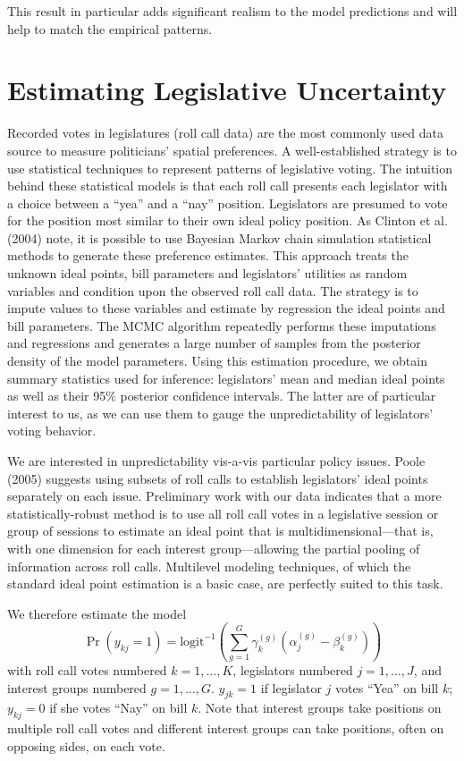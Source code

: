 \documentclass[12pt]{article}
\newcommand{\ga}{\gamma}
\begin{document}
This result in particular adds significant realism to the model predictions and will help to match the empirical patterns.
		
		
\section{Estimating Legislative Uncertainty}
\label{sec:est}

Recorded votes in legislatures (roll call data) are the most commonly used data source to measure politicians' spatial preferences. A well-established strategy is to use statistical techniques to represent patterns of legislative voting. The intuition behind these statistical models is that each roll call presents each legislator with a choice between a ``yea'' and a ``nay'' position. Legislators are presumed to vote for the position most similar to their own ideal policy position. As Clinton et al. (2004) note, it is possible to use Bayesian Markov chain simulation statistical methods to generate these preference estimates. This approach treats the unknown ideal points, bill parameters and legislators' utilities as random variables and condition upon the observed roll call data. The strategy is to impute values to these variables and estimate by regression the ideal points and bill parameters. The MCMC algorithm repeatedly performs these imputations and regressions and generates a large number of samples from the posterior density of the model parameters. Using this estimation procedure, we obtain summary statistics used for inference: legislators' mean and median ideal points as well as their 95$\%$ posterior confidence intervals. The latter are of particular interest to us, as we can use them to gauge the unpredictability of  legislators' voting behavior.

We are interested in unpredictability vis-a-vis particular policy issues. Poole (2005) suggests using subsets of roll calls to establish legislators' ideal points separately on each issue. Preliminary work with our data indicates that a more statistically-robust method is to use all roll call votes in a legislative session or group of sessions to estimate an ideal point that is multidimensional---that is, with one dimension for each interest group---allowing the partial pooling of information across roll calls. Multilevel modeling techniques, of which the standard ideal point estimation is a basic case, are perfectly suited to this task.

We therefore estimate the model
\begin{equation}
  \Pr(y_{kj} = 1) = \text{logit}^{-1}\left( \sum_{g=1}^G \ga_k^{(g)}\left( \alpha_j^{(g)} - \beta_k^{(g)}\right) \right)
	\label{eq:v2}
\end{equation}
with roll call votes numbered $k=1,\ldots,K$, legislators numbered $j=1,\dots,J$, and interest groups numbered $g=1,\dots,G$. $y_{jk}=1$ if legislator $j$ votes ``Yea'' on bill $k$; $y_{kj}=0$ if she votes ``Nay'' on bill $k$. Note that interest groups take positions on multiple roll call votes and different interest groups can take positions, often on opposing sides, on each vote.
		
\end{document}
